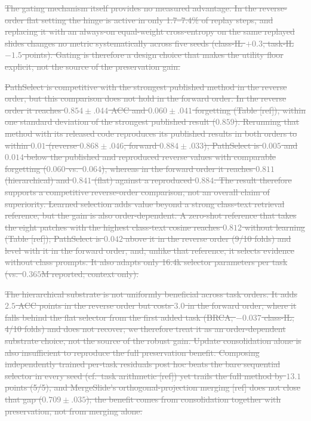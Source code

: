 \documentclass{article}
\newif\ifmarkup \markuptrue
\newcommand{\repc}[3]{\ifmarkup\textcolor{gray}{\sout{#2}}\textcolor{#1}{#3}\else#3\fi}
\newcommand{\repG}[2]{\repc{teal}{#1}{#2}}    %
\begin{document}
\repG{The gating mechanism itself provides no measured advantage. In the reverse-order flat setting the hinge is active in only 1.7--7.4\% of replay steps, and replacing it with an always-on equal-weight cross-entropy on the same replayed slides changes no metric systematically across five seeds (class-IL $+0.3$, task-IL $-1.5$ points). Gating is therefore a design choice that makes the utility floor explicit, not the source of the preservation gain.}{}

\repG{PathSelect is competitive with the strongest published method in the reverse order, but this comparison does not hold in the forward order. In the reverse order it reaches $0.854{\pm}.044$ ACC and $0.060{\pm}.041$ forgetting (Table [ref]), within one standard deviation of the strongest published result ($0.859$). Rerunning that method with its released code reproduces its published results in both orders to within $0.01$ (reverse $0.868{\pm}.046$, forward $0.884{\pm}.033$); PathSelect is $0.005$ and $0.014$ below the published and reproduced reverse values with comparable forgetting ($0.060$ vs.\ $0.064$), whereas in the forward order it reaches $0.811$ (hierarchical) and $0.841$ (flat) against a reproduced $0.884$. The result therefore supports a competitive reverse-order comparison, not an overall claim of superiority. Learned selection adds value beyond a strong class-text retrieval reference, but the gain is also order-dependent. A zero-shot reference that takes the eight patches with the highest class-text cosine reaches $0.812$ without learning (Table [ref]); PathSelect is $0.042$ above it in the reverse order (9/10 folds) and level with it in the forward order, and, unlike that reference, it selects evidence without class prompts. It also adapts only 16.4k selector parameters per task (vs.\ $0.365$M reported; context only).}{}

\repG{The hierarchical substrate is not uniformly beneficial across task orders. It adds $2.5$ ACC points in the reverse order but costs $3.0$ in the forward order, where it falls behind the flat selector from the first added task (BRCA, $-0.037$ class-IL, 4/10 folds) and does not recover; we therefore treat it as an order-dependent substrate choice, not the source of the robust gain. Update consolidation alone is also insufficient to reproduce the full preservation benefit. Composing independently trained per-task residuals post hoc beats the bare sequential selector in every seed (cf.\ task arithmetic [ref]) yet trails the full method by $13.1$ points (5/5), and MergeSlide's orthogonal-projection merging [ref] does not close that gap ($0.709{\pm}.035$); the benefit comes from consolidation together with preservation, not from merging alone.}{}
\end{document}

